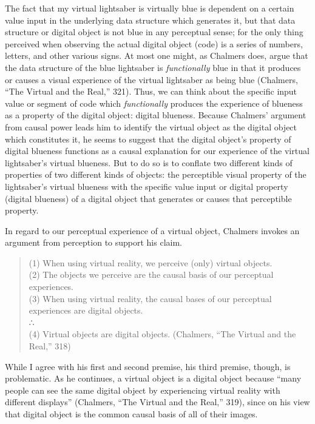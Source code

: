 \documentclass{article}
\begin{document}
The fact that my virtual lightsaber is virtually blue is dependent on a certain value input in the underlying data structure which generates it, but that data structure or digital object is not blue in any perceptual sense; for the only thing perceived when observing the actual digital object (code) is a series of numbers, letters, and other various signs. At most one might, as Chalmers does, argue that the data structure of the blue lightsaber is \textit{functionally} blue in that it produces or causes a visual experience of the virtual lightsaber as being blue (Chalmers, ``The Virtual and the Real,'' 321). Thus, we can think about the specific input value or segment of code which \textit{functionally} produces the experience of blueness as a property of the digital object: digital blueness. Because Chalmers’ argument from causal power leads him to identify the virtual object as the digital object which constitutes it, he seems to suggest that the digital object’s property of digital blueness functions as a causal explanation for our experience of the virtual lightsaber’s virtual blueness. But to do so is to conflate two different kinds of properties of two different kinds of objects: the perceptible visual property of the lightsaber’s virtual blueness with the specific value input or digital property (digital blueness) of a digital object that generates or causes that perceptible property.

In regard to our perceptual experience of a virtual object, Chalmers invokes an argument from perception to support his claim.

\begin{quote}
(1) When using virtual reality, we perceive (only) virtual objects. \\
(2) The objects we perceive are the causal basis of our perceptual experiences. \\
(3) When using virtual reality, the causal bases of our perceptual experiences are digital objects. \\
∴ \\
(4) Virtual objects are digital objects. (Chalmers, ``The Virtual and the Real,'' 318)
\end{quote}

While I agree with his first and second premise, his third premise, though, is problematic. As he continues, a virtual object is a digital object because ``many people can see the same digital object by experiencing virtual reality with different displays'' (Chalmers, ``The Virtual and the Real,'' 319), since on his view that digital object is the common causal basis of all of their images.
\end{document}
